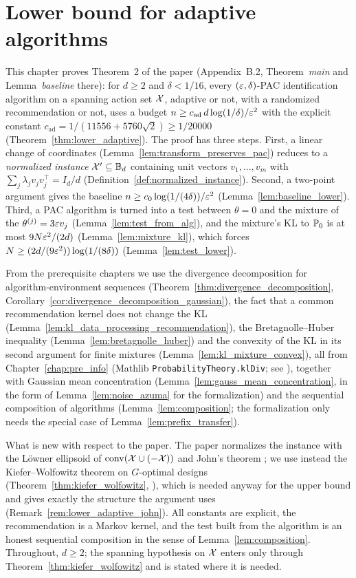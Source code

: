 \chapter{Lower bound for adaptive algorithms}
\label{chap:lower_adaptive}

This chapter proves Theorem~2 of the paper (Appendix~B.2, Theorem~\emph{main} and
Lemma~\emph{baseline} there): for $d \ge 2$ and $\delta < 1/16$, every $(\varepsilon,\delta)$-PAC
identification algorithm on a spanning action set $\mathcal{X}$, adaptive or not, with a randomized
recommendation or not,
uses a budget $n \ge c_{\mathrm{ad}}\, d\log(1/\delta)/\varepsilon^2$ with the explicit constant
$c_{\mathrm{ad}} = 1/(11556 + 5760\sqrt2) \ge 1/20000$ (Theorem~\ref{thm:lower_adaptive}).
The proof has three steps. First, a linear change of coordinates
(Lemma~\ref{lem:transform_preserves_pac}) reduces to a \emph{normalized instance}
$\mathcal{X}' \subseteq \mathbb{B}_d$ containing unit vectors $v_1,\dots,v_m$ with
$\sum_j \lambda_j v_jv_j^\top = I_d/d$ (Definition~\ref{def:normalized_instance}). Second, a
two-point argument gives the baseline $n \ge c_0\log(1/(4\delta))/\varepsilon^2$
(Lemma~\ref{lem:baseline_lower}). Third, a PAC algorithm is turned into a test between
$\theta = 0$ and the mixture of the $\theta^{(j)} = 3\varepsilon v_j$
(Lemma~\ref{lem:test_from_alg}), and the mixture's KL to $\mathbb{P}_0$ is at most
$9N\varepsilon^2/(2d)$ (Lemma~\ref{lem:mixture_kl}), which forces $N \ge (2d/(9\varepsilon^2))\log(1/(8\delta))$
(Lemma~\ref{lem:test_lower}).

From the prerequisite chapters we use the divergence decomposition for algorithm-environment
sequences (Theorem~\ref{thm:divergence_decomposition},
Corollary~\ref{cor:divergence_decomposition_gaussian}), the fact that a common recommendation
kernel does not change the KL (Lemma~\ref{lem:kl_data_processing_recommendation}), the
Bretagnolle--Huber inequality (Lemma~\ref{lem:bretagnolle_huber}) and the convexity of the KL
in its second argument for finite mixtures (Lemma~\ref{lem:kl_mixture_convex}), all from
Chapter~\ref{chap:pre_info} (Mathlib \texttt{ProbabilityTheory.klDiv}; see
\cite[Chapters~14 and~15]{lattimore2020bandit}), together with Gaussian mean concentration
(Lemma~\ref{lem:gauss_mean_concentration}, in the form of Lemma~\ref{lem:noise_azuma} for the
formalization) and the sequential composition of algorithms (Lemma~\ref{lem:composition}; the
formalization only needs the special case of Lemma~\ref{lem:prefix_transfer}).

What is new with respect to the paper. The paper normalizes the instance with the L\"owner
ellipsoid of $\operatorname{conv}(\mathcal{X}\cup(-\mathcal{X}))$ and John's theorem \cite{ball1997elementary}; we use
instead the Kiefer--Wolfowitz theorem on $G$-optimal designs
(Theorem~\ref{thm:kiefer_wolfowitz}, \cite{kiefer1960equivalence,pukelsheim2006optimal}),
which is needed anyway for the upper bound and gives exactly the structure the argument
uses (Remark~\ref{rem:lower_adaptive_john}). All constants are explicit, the recommendation
is a Markov kernel, and the test built from the algorithm is an honest sequential
composition in the sense of Lemma~\ref{lem:composition}. Throughout, $d \ge 2$; the spanning
hypothesis on $\mathcal{X}$ enters only through Theorem~\ref{thm:kiefer_wolfowitz} and is stated where
it is needed.

